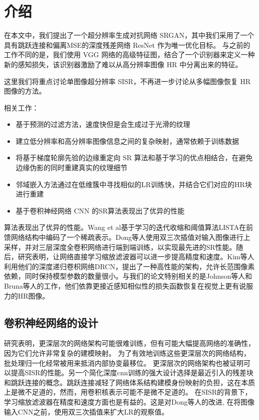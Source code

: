 \documentclass[UTF8,a4paper,10pt]{ctexrep}
\begin{document}
\section{介绍}
在本文中，我们提出了一个超分辨率生成对抗网络 SRGAN，其中我们采用了一个具有跳跃连接和偏离MSE的深度残差网络 ResNet 作为唯一优化目标。
与之前的工作不同的是，我们使用 VGG 网络的高级特征图，结合了一个识别器来定义一种新的感知损失，该识别器激励了难以从高分辨率图像 HR 中分离出来的特征。

这里我们将重点讨论单图像超分辨率 SISR，不再进一步讨论从多幅图像恢复 HR 图像的方法。

相关工作：
\begin{itemize}
  \item 基于预测的过滤方法，速度快但是会生成过于光滑的纹理
  \item 建立低分辨率和高分辨率图像信息之间的复杂映射，通常依赖于训练数据
  \item 将基于梯度轮廓先验的边缘重定向 SR 算法和基于学习的优点相结合，在避免边缘伪影的同时重建真实的纹理细节
  \item 邻域嵌入方法通过在低维簇中寻找相似的LR训练快，并结合它们对应的HR块进行重建
  \item 基于卷积神经网络 CNN 的SR算法表现出了优异的性能
\end{itemize}

算法表现出了优异的性能。Wang et al基于学习的迭代收缩和阈值算法LISTA在前馈网络结构中编码了一个稀疏表示。Dong等人使用双三次插值对输入图像进行上采样，并对三层深度全卷积网络进行端到端训练，以实现最先进的SR性能。随后，研究表明，让网络直接学习缩放滤波器可以进一步提高精度和速度。Kim等人利用他们的深度递归卷枳网络DRCN，提出了一种高性能的架构，允许长范围像素依赖，同时保持模型参数的数量很小。与我们的论文特别相关的是Johnson等人和Bruna等人的工作，他们依靠更接近感知相似性的损失函数恢复在视觉上更有说服力的HR图像。

\subsection{卷积神经网络的设计}
研究表明，更深层次的网络架构可能很难训练，但有可能大幅提高网络的准确性，因为它们允许非常复杂的建模映射。
为了有效地训练这些更深层次的网络结构，批处理归一化经常被用来抵消内部协变最移位。
更深层次的网络架构也被证明可以提高SISR的性能。另一个简化深度cnn训练的强大设计选择是最近引入的残差块和跳跃连接的概念。跳跃连接减轻了网络体系结构建模身份映射的负担，这在本质上是微不足道的，然而，用卷积核表示可能不是微不足道的。
在SISR的背景下，学习缩放滤波器在精度和速度方面也是有益的。这是对Dong等人的改进, 在将图像输入CNN之前，使用双三次插值来扩大LR的观察值。
\end{document}
